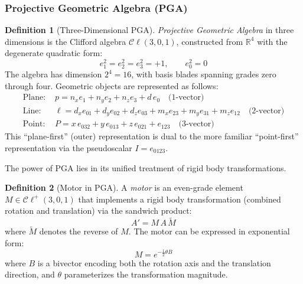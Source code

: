 \documentclass[manuscript, nonacm, review=false]{acmart}
\theoremstyle{definition}
\newtheorem{definition}{Definition}[section]
\theoremstyle{plain}
\newcommand{\R}{\mathbb{R}}
\newcommand{\Cl}{\mathcal{C}\!\ell}
\begin{document}
\subsubsection{Projective Geometric Algebra (PGA)}

\begin{definition}[Three-Dimensional PGA]
\label{def:pga}
\emph{Projective Geometric Algebra} in three dimensions is the Clifford algebra $\Cl(3,0,1)$, constructed from $\R^4$ with the degenerate quadratic form:
\begin{equation}
    e_1^2 = e_2^2 = e_3^2 = +1, \qquad e_0^2 = 0
\end{equation}
The algebra has dimension $2^4 = 16$, with basis blades spanning grades zero through four. Geometric objects are represented as follows:
\begin{align}
    \text{Plane: } & p = n_x e_1 + n_y e_2 + n_z e_3 + d\, e_0 \quad \text{(1-vector)} \label{eq:pga_plane} \\
    \text{Line: } & \ell = d_x e_{01} + d_y e_{02} + d_z e_{03} + m_x e_{23} + m_y e_{31} + m_z e_{12} \quad \text{(2-vector)} \label{eq:pga_line} \\
    \text{Point: } & P = x\, e_{032} + y\, e_{013} + z\, e_{021} + e_{123} \quad \text{(3-vector)} \label{eq:pga_point}
\end{align}
This ``plane-first'' (outer) representation is dual to the more familiar ``point-first'' representation via the pseudoscalar $I = e_{0123}$.
\end{definition}

The power of PGA lies in its unified treatment of rigid body transformations.

\begin{definition}[Motor in PGA]
\label{def:motor}
A \emph{motor} is an even-grade element $M \in \Cl^+(3,0,1)$ that implements a rigid body transformation (combined rotation and translation) via the sandwich product:
\begin{equation}
    A' = M\, A\, \widetilde{M}
    \label{eq:motor_sandwich}
\end{equation}
where $\widetilde{M}$ denotes the reverse of $M$. The motor can be expressed in exponential form:
\begin{equation}
    M = e^{-\frac{1}{2}\theta B}
    \label{eq:motor_exponential}
\end{equation}
where $B$ is a bivector encoding both the rotation axis and the translation direction, and $\theta$ parameterizes the transformation magnitude.
\end{definition}
\end{document}
